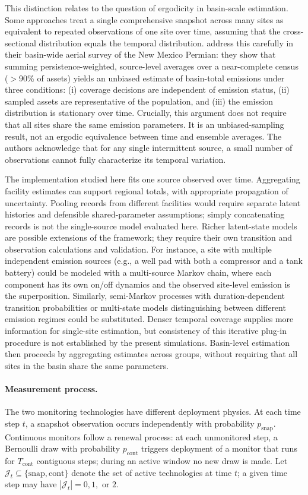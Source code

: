 \documentclass[11pt]{article}
\begin{document}
This distinction relates to the question of ergodicity in basin-scale estimation. Some approaches treat a single comprehensive snapshot across many sites as equivalent to repeated observations of one site over time, assuming that the cross-sectional distribution equals the temporal distribution. \citet{Chen2022EST} address this carefully in their basin-wide aerial survey of the New Mexico Permian: they show that summing persistence-weighted, source-level averages over a near-complete census ($>$90\% of assets) yields an unbiased estimate of basin-total emissions under three conditions: (i) coverage decisions are independent of emission status, (ii) sampled assets are representative of the population, and (iii) the emission distribution is stationary over time. Crucially, this argument does not require that all sites share the same emission parameters. It is an unbiased-sampling result, not an ergodic equivalence between time and ensemble averages. The authors acknowledge that for any single intermittent source, a small number of observations cannot fully characterize its temporal variation.

The implementation studied here fits one source observed over time. Aggregating facility estimates can support regional totals, with appropriate propagation of uncertainty. Pooling records from different facilities would require separate latent histories and defensible shared-parameter assumptions; simply concatenating records is not the single-source model evaluated here. Richer latent-state models are possible extensions of the framework; they require their own transition and observation calculations and validation. For instance, a site with multiple independent emission sources (e.g., a well pad with both a compressor and a tank battery) could be modeled with a multi-source Markov chain, where each component has its own on/off dynamics and the observed site-level emission is the superposition. Similarly, semi-Markov processes with duration-dependent transition probabilities or multi-state models distinguishing between different emission regimes could be substituted. Denser temporal coverage supplies more information for single-site estimation, but consistency of this iterative plug-in procedure is not established by the present simulations. Basin-level estimation then proceeds by aggregating estimates across groups, without requiring that all sites in the basin share the same parameters.

\paragraph{Measurement process.} The two monitoring technologies have different deployment physics. At each time step $t$, a snapshot observation occurs independently with probability $p_{\text{snap}}$. Continuous monitors follow a renewal process: at each unmonitored step, a Bernoulli draw with probability $p_{\text{cont}}$ triggers deployment of a monitor that runs for $T_{\text{cont}}$ contiguous steps; during an active window no new draw is made. Let $\mathcal{J}_t \subseteq \{\text{snap}, \text{cont}\}$ denote the set of active technologies at time $t$; a given time step may have $|\mathcal{J}_t| = 0, 1,$ or $2$.
\end{document}
